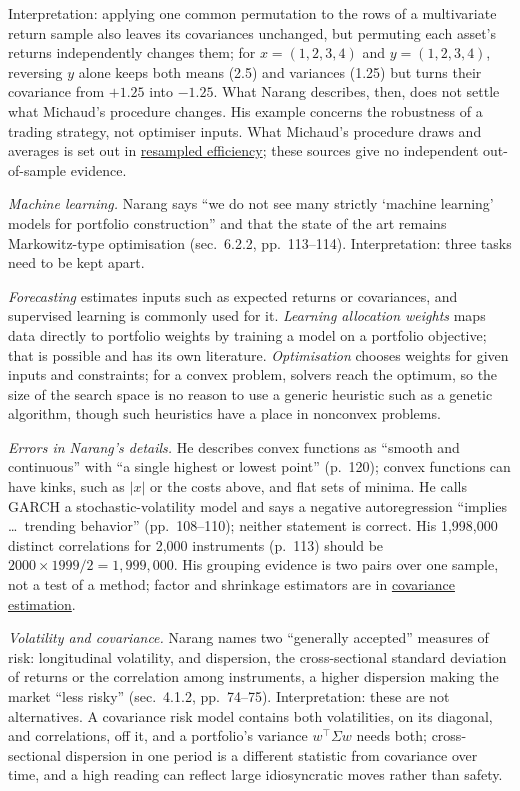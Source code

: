 \begin{qfmodel}
Interpretation: applying one common permutation to the rows of a multivariate return sample also leaves its covariances unchanged, but permuting each asset's returns independently changes them; for $x=(1,2,3,4)$ and $y=(1,2,3,4)$, reversing $y$ alone keeps both means (2.5) and variances (1.25) but turns their covariance from $+1.25$ into $-1.25$. What Narang describes, then, does not settle what Michaud's procedure changes. His example concerns the robustness of a trading strategy, not optimiser inputs. What Michaud's procedure draws and averages is set out in \hyperref[meth:resampled-efficiency]{resampled efficiency}; these sources give no independent out-of-sample evidence.

\emph{Machine learning.} Narang says ``we do not see many strictly `machine learning' models for portfolio construction'' and that the state of the art remains Markowitz-type optimisation (sec.~6.2.2, pp.~113--114). Interpretation: three tasks need to be kept apart.

\emph{Forecasting} estimates inputs such as expected returns or covariances, and supervised learning is commonly used for it. \emph{Learning allocation weights} maps data directly to portfolio weights by training a model on a portfolio objective; that is possible and has its own literature. \emph{Optimisation} chooses weights for given inputs and constraints; for a convex problem, solvers reach the optimum, so the size of the search space is no reason to use a generic heuristic such as a genetic algorithm, though such heuristics have a place in nonconvex problems.

\emph{Errors in Narang's details.} He describes convex functions as ``smooth and continuous'' with ``a single highest or lowest point'' (p.~120); convex functions can have kinks, such as $\lvert x\rvert$ or the costs above, and flat sets of minima. He calls GARCH a stochastic-volatility model and says a negative autoregression ``implies \dots\ trending behavior'' (pp.~108--110); neither statement is correct. His 1{,}998{,}000 distinct correlations for 2{,}000 instruments (p.~113) should be $2000\times1999/2=1{,}999{,}000$. His grouping evidence is two pairs over one sample, not a test of a method; factor and shrinkage estimators are in \hyperref[meth:portfolio-covariance-estimation]{covariance estimation}.

\emph{Volatility and covariance.} Narang names two ``generally accepted'' measures of risk: longitudinal volatility, and dispersion, the cross-sectional standard deviation of returns or the correlation among instruments, a higher dispersion making the market ``less risky'' (sec.~4.1.2, pp.~74--75). Interpretation: these are not alternatives. A covariance risk model contains both volatilities, on its diagonal, and correlations, off it, and a portfolio's variance $w^\top\Sigma w$ needs both; cross-sectional dispersion in one period is a different statistic from covariance over time, and a high reading can reflect large idiosyncratic moves rather than safety.


\end{qfmodel}
